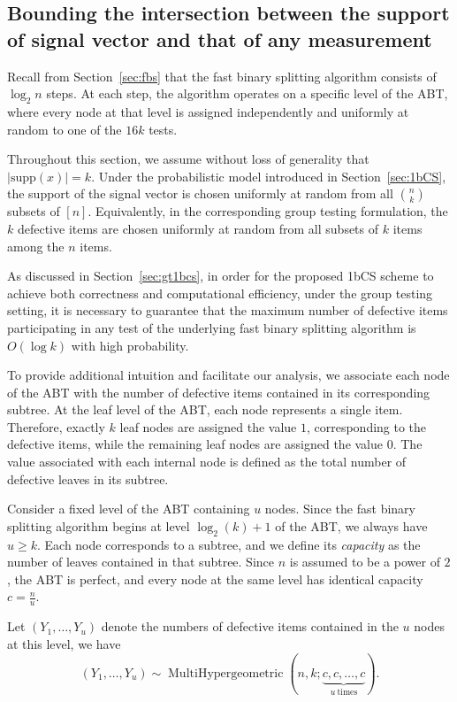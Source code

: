 \documentclass{article}
\newcommand{\supp}{\mathrm{supp}}
\begin{document}
\subsection{Bounding the intersection between the support of signal vector and that of any measurement}\label{sec:bib}

Recall from Section~\ref{sec:fbs} that the fast binary splitting algorithm consists of $\log_2 n$ steps. At each step, the algorithm operates on a specific level of the ABT, where every node at that level is assigned independently and uniformly at random to one of the $16k$ tests.

Throughout this section, we assume without loss of generality that
$|\supp(x)|=k$. Under the probabilistic model introduced in
Section~\ref{sec:1bCS}, the support of the signal vector is chosen uniformly
at random from all ${n\choose k}$ subsets of $[n]$. Equivalently, in the
corresponding group testing formulation, the $k$ defective items are chosen
uniformly at random from all subsets of $k$ items among the $n$ items.

As discussed in Section~\ref{sec:gt1bcs}, in order for the proposed 1bCS
scheme to achieve both correctness and computational efficiency, under the group testing setting, it is
necessary to guarantee that the maximum number of defective items
participating in any test of the underlying fast binary splitting algorithm is
$O(\log k)$ with high probability.

To provide additional intuition and facilitate our analysis, we associate each node of the ABT with the number of defective items contained in its corresponding subtree. At the leaf level of the ABT, each node represents a single item. Therefore, exactly $k$ leaf nodes are assigned the value $1$, corresponding to the defective items, while the remaining leaf nodes are assigned the value $0$. The value associated with each internal node is defined as the total number of defective leaves in its subtree.

Consider a fixed level of the ABT containing $u$ nodes. Since the fast binary splitting algorithm begins at level $\log_2(k)+1$ of the ABT, we always have $u\geq k$. Each node corresponds to a subtree, and we define its \emph{capacity} as the number of leaves contained in that subtree. Since $n$ is
assumed to be a power of $2$, the ABT is perfect, and every node at
the same level has identical capacity
\(
c=\frac{n}{u}.
\)

Let $(Y_1,\ldots,Y_u)$ denote the numbers of defective items contained in the
$u$ nodes at this level, we have
\begin{equation}\label{eqn:multi}
(Y_1,\ldots,Y_u)
\sim
\operatorname{MultiHypergeometric}
\left(
n,k;\underbrace{c,c,\ldots,c}_{u\ \text{times}}
\right).
\end{equation}
\end{document}
